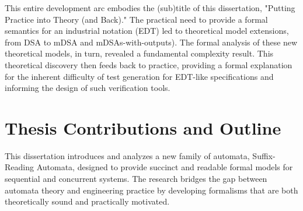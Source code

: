 
This entire development arc embodies the (sub)title of this dissertation, "Putting Practice into Theory (and Back)." The practical need to provide a formal semantics for an industrial notation (EDT) led to theoretical model extensions, from DSA to mDSA and mDSAs-with-outputs). The formal analysis of these new theoretical models, in turn, revealed a fundamental complexity result. This theoretical discovery then feeds back to practice, providing a formal explanation for the inherent difficulty of test generation for EDT-like specifications and informing the design of such verification tools.

\section{Thesis Contributions and Outline}
This dissertation introduces and analyzes a new family of automata, Suffix-Reading Automata, designed to provide succinct and readable formal models for sequential and concurrent systems. The research bridges the gap between automata theory and engineering practice by developing formalisms that are both theoretically sound and practically motivated.

